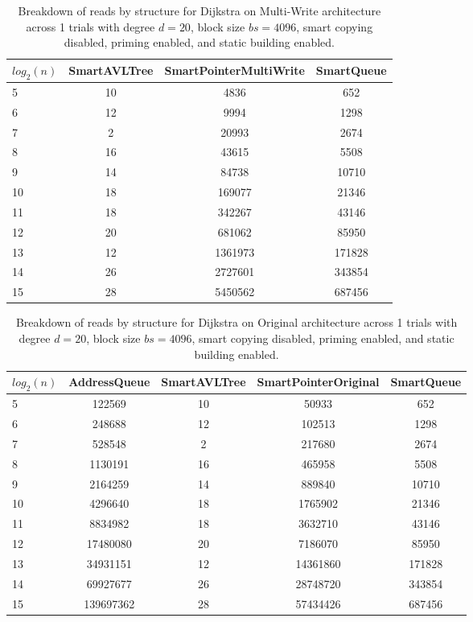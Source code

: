 \begin{table}[]
\centering
\begin{tabular}{|l|c|c|c|}
$log_2(n)$ & SmartAVLTree & SmartPointerMultiWrite & SmartQueue \\ \hline
5 & 10 & 4836 & 652 \\ \hline
6 & 12 & 9994 & 1298 \\ \hline
7 & 2 & 20993 & 2674 \\ \hline
8 & 16 & 43615 & 5508 \\ \hline
9 & 14 & 84738 & 10710 \\ \hline
10 & 18 & 169077 & 21346 \\ \hline
11 & 18 & 342267 & 43146 \\ \hline
12 & 20 & 681062 & 85950 \\ \hline
13 & 12 & 1361973 & 171828 \\ \hline
14 & 26 & 2727601 & 343854 \\ \hline
15 & 28 & 5450562 & 687456 \\ \hline
\end{tabular}
\caption{Breakdown of reads by structure for Dijkstra on Multi-Write architecture across 1 trials with degree $d=20$, block size $bs=4096$, smart copying disabled, priming enabled, and static building enabled.}
    \label{tab:reads_by_structure_dijkstra_d20_bs4096_trials1_copiesfalse_primetrue_staticinsertiontrue_ptmultiwrite_movetrue}
\end{table}

\begin{table}[]
\centering
\begin{tabular}{|l|c|c|c|c|}
$log_2(n)$ & AddressQueue & SmartAVLTree & SmartPointerOriginal & SmartQueue \\ \hline
5 & 122569 & 10 & 50933 & 652 \\ \hline
6 & 248688 & 12 & 102513 & 1298 \\ \hline
7 & 528548 & 2 & 217680 & 2674 \\ \hline
8 & 1130191 & 16 & 465958 & 5508 \\ \hline
9 & 2164259 & 14 & 889840 & 10710 \\ \hline
10 & 4296640 & 18 & 1765902 & 21346 \\ \hline
11 & 8834982 & 18 & 3632710 & 43146 \\ \hline
12 & 17480080 & 20 & 7186070 & 85950 \\ \hline
13 & 34931151 & 12 & 14361860 & 171828 \\ \hline
14 & 69927677 & 26 & 28748720 & 343854 \\ \hline
15 & 139697362 & 28 & 57434426 & 687456 \\ \hline
\end{tabular}
\caption{Breakdown of reads by structure for Dijkstra on Original architecture across 1 trials with degree $d=20$, block size $bs=4096$, smart copying disabled, priming enabled, and static building enabled.}
    \label{tab:reads_by_structure_dijkstra_d20_bs4096_trials1_copiesfalse_primetrue_staticinsertiontrue_ptoriginal_movefalse}
\end{table}

